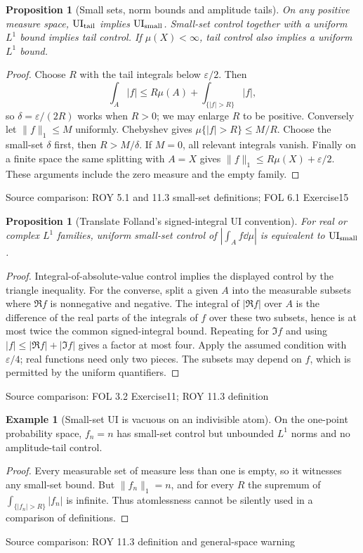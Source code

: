 \documentclass[11pt,oneside,openany]{book}
\newtheorem{proposition}[theorem]{Proposition}
\theoremstyle{definition}
\newtheorem{example}[theorem]{Example}
\theoremstyle{remark}
\newcommand{\eps}{\varepsilon}\newcommand{\ee}{\varepsilon}
\newcommand{\family}[1]{}
\newcommand{\source}[1]{\par\begingroup\small\sffamily\color{black!65}Source comparison: #1\par\endgroup}
\begin{document}
\begin{proposition}[Small sets, norm bounds and amplitude tails]\family{D11.17.definition_comparison}\label{d11:17:definition-comparison}
On any positive measure space, $\mathrm{UI}_{\rm tail}$ implies $\mathrm{UI}_{\rm small}$. Small-set control together with a uniform $L^1$ bound implies tail control. If $\mu(X)<\infty$, tail control also implies a uniform $L^1$ bound.
\end{proposition}
\begin{proof}
Choose $R$ with the tail integrals below $\eps/2$. Then
\[\int_A|f|\le R\mu(A)+\int_{\{|f|>R\}}|f|,\]
so $\delta=\eps/(2R)$ works when $R>0$; we may enlarge $R$ to be positive. Conversely let $\|f\|_1\le M$ uniformly. Chebyshev gives $\mu\{|f|>R\}\le M/R$. Choose the small-set $\delta$ first, then $R>M/\delta$. If $M=0$, all relevant integrals vanish. Finally on a finite space the same splitting with $A=X$ gives $\|f\|_1\le R\mu(X)+\eps/2$. These arguments include the zero measure and the empty family.
\end{proof}
\source{ROY 5.1 and 11.3 small-set definitions; FOL 6.1 Exercise15}

\begin{proposition}[Translate Folland's signed-integral UI convention]\family{D11.17.folland_ui_convention}\label{d11:17:folland-ui-convention}
For real or complex $L^1$ families, uniform small-set control of $\left|\int_A f\dd\mu\right|$ is equivalent to $\mathrm{UI}_{\rm small}$.
\end{proposition}
\begin{proof}
Integral-of-absolute-value control implies the displayed control by the triangle inequality. For the converse, split a given $A$ into the measurable subsets where $\Re f$ is nonnegative and negative. The integral of $|\Re f|$ over $A$ is the difference of the real parts of the integrals of $f$ over these two subsets, hence is at most twice the common signed-integral bound. Repeating for $\Im f$ and using $|f|\le|\Re f|+|\Im f|$ gives a factor at most four. Apply the assumed condition with $\eps/4$; real functions need only two pieces. The subsets may depend on $f$, which is permitted by the uniform quantifiers.
\end{proof}
\source{FOL 3.2 Exercise11; ROY 11.3 definition}

\begin{example}[Small-set UI is vacuous on an indivisible atom]\family{D11.17.atomic_ui_counterexample}\label{d11:17:atomic-ui-counterexample}
On the one-point probability space, $f_n=n$ has small-set control but unbounded $L^1$ norms and no amplitude-tail control.
\end{example}
\begin{proof}
Every measurable set of measure less than one is empty, so it witnesses any small-set bound. But $\|f_n\|_1=n$, and for every $R$ the supremum of $\int_{\{|f_n|>R\}}|f_n|$ is infinite. Thus atomlessness cannot be silently used in a comparison of definitions.
\end{proof}
\source{ROY 11.3 definition and general-space warning}
\end{document}
